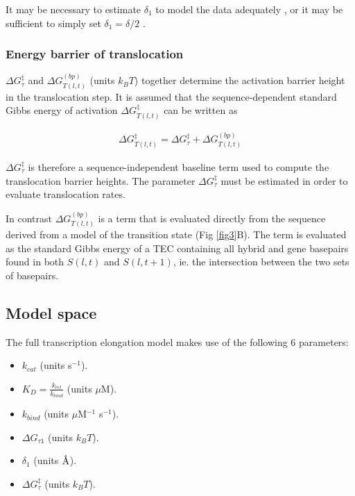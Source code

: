 \documentclass[10pt,letterpaper]{article}
\newcommand{\angstrom}{\mbox{\normalfont\AA}}
\begin{document}
It may be necessary to estimate $\delta_1$ to model the data adequately \cite{maoileidigh2011unified}, or it may be sufficient to simply set $\delta_1 = \delta / 2$ \cite{depken2009origin}. \\


\subsubsection*{Energy barrier of translocation}


$\Delta G^\ddag_{\tau}$ and $\Delta G_{T(l,t)}^{(bp)}$ (units $k_BT$) together determine the activation barrier height in the translocation step. It is assumed that the sequence-dependent standard Gibbs energy of activation $\Delta G_{T(l,t)}^{\ddag}$ can be written as



\begin{eqnarray}
\label{eq:translocationBarrier}
    \Delta G_{T(l,t)}^{\ddag} = \Delta G^\ddag_{\tau} + \Delta G_{T(l,t)}^{(bp)}
\end{eqnarray}



$\Delta G^\ddag_{\tau}$ is therefore a sequence-independent baseline term used to compute the translocation barrier heights.  The parameter $\Delta G^\ddag_{\tau}$ must be estimated in order to evaluate translocation rates.




In contrast $\Delta G_{T(l,t)}^{(bp)}$ is a term that is evaluated directly from the sequence derived from a model of the transition state (Fig \ref{fig3}B). The term is evaluated as the standard Gibbs energy of a TEC containing all hybrid and gene basepairs found in both $S(l,t)$ and $S(l,t+1)$, ie. the intersection between the two sets of basepairs.








\subsection*{Model space}

The full transcription elongation model makes use of the following 6 parameters:

\begin{itemize}
\item $k_{cat}$ (units s$^{-1}$).
\item $K_D = \frac{k_{rel}}{k_{bind}}$ (units $\mu$M).
\item $k_{bind}$ (units $\mu$M$^{-1}$ s$^{-1}$).
\item $\Delta G_{\tau 1}$ (units $k_BT$).
\item $\delta_1$ (units $\angstrom$).
\item $\Delta G^\ddag_{\tau}$ (units $k_BT$).
\end{itemize}
\end{document}
